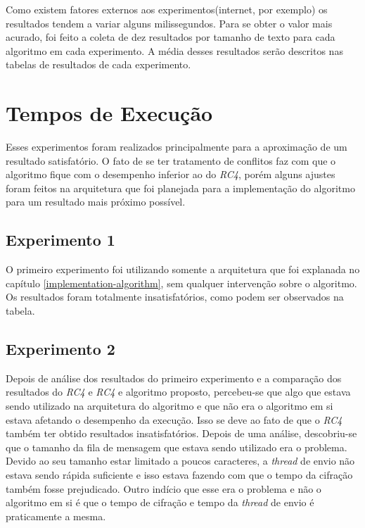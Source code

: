 Como existem fatores externos aos experimentos(internet, por exemplo) os resultados tendem a variar alguns milissegundos. Para se obter o valor mais acurado, foi feito a coleta de dez resultados por tamanho de texto para cada algoritmo em cada experimento. A média desses resultados serão descritos nas tabelas de resultados de cada experimento.

\section{Tempos de Execução}

Esses experimentos foram realizados principalmente para a aproximação de um resultado satisfatório. O fato de se ter tratamento de conflitos faz com que o algoritmo fique com o desempenho inferior ao do \textit{RC4}, porém alguns ajustes foram feitos na arquitetura que foi planejada para a implementação do algoritmo para um resultado mais próximo possível.

\subsection{Experimento 1}

O primeiro experimento foi utilizando somente a arquitetura que foi explanada no capítulo \ref{implementation-algorithm}, sem qualquer intervenção sobre o algoritmo. Os resultados foram totalmente insatisfatórios, como podem ser observados na tabela.

\subsection{Experimento 2}

Depois de análise dos resultados do primeiro experimento e a comparação dos resultados do \textit{RC4} e \textit{RC4} e algoritmo proposto, percebeu-se que algo que estava sendo utilizado na arquitetura do algoritmo e que não era o algoritmo em si estava afetando o desempenho da execução. Isso se deve ao fato de que o \textit{RC4} também ter obtido resultados insatisfatórios. Depois de uma análise, descobriu-se que o tamanho da fila de mensagem que estava sendo utilizado era o problema. Devido ao seu tamanho estar limitado a poucos caracteres, a \textit{thread} de envio não estava sendo rápida suficiente e isso estava fazendo com que o tempo da cifração também fosse prejudicado. Outro indício que esse era o problema e não o algoritmo em si é que o tempo de cifração e tempo da \textit{thread} de envio é praticamente a mesma. 

